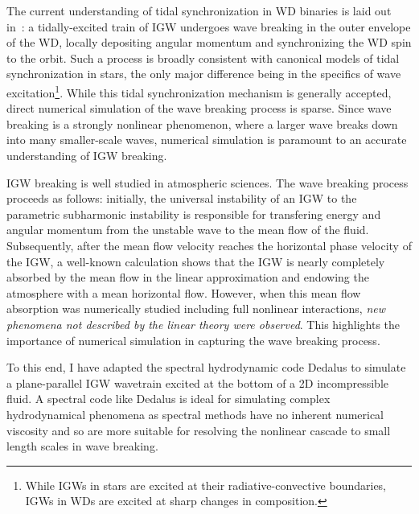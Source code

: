 \documentclass[12pt,
        usenames, %
        dvipsnames %
    ]{article}
\begin{document}
The current understanding of tidal synchronization in WD binaries is laid out
in~\cite{fullerII}: a tidally-excited train of IGW undergoes wave breaking
in the outer envelope of the WD, locally depositing angular momentum and
synchronizing the WD spin to the orbit. Such a process is broadly consistent
with canonical models of tidal synchronization in stars\cite{zahn75,gn89}, the
only major difference being in the specifics of wave excitation\footnote{While
IGWs in stars are excited at their radiative-convective boundaries, IGWs in WDs
are excited at sharp changes in composition.}. While this tidal synchronization
mechanism is generally accepted, direct numerical simulation of the wave
breaking process is sparse. Since wave breaking is a strongly nonlinear
phenomenon, where a larger wave breaks down into many smaller-scale waves,
numerical simulation is paramount to an accurate understanding of IGW breaking.

IGW breaking is well studied in atmospheric sciences. The wave breaking process
proceeds as follows: initially, the universal instability of an IGW to the
parametric subharmonic instability is responsible for transfering energy and
angular momentum from the unstable wave to the mean flow of the
fluid\cite{drazin}. Subsequently, after the mean flow velocity reaches the
horizontal phase velocity of the IGW, a well-known calculation shows that the
IGW is nearly completely absorbed by the mean flow in the linear
approximation and endowing the atmosphere with a mean horizontal
flow\cite{booker_bretherton,hazel}. However, when this mean flow absorption was
numerically studied including full nonlinear interactions, \emph{new phenomena
not described by the linear theory were observed}\cite{jones_num,winters1994}.
This highlights the importance of numerical simulation in capturing the wave
breaking process.

To this end, I have adapted the spectral hydrodynamic code Dedalus\cite{dedalus}
to simulate a plane-parallel IGW wavetrain excited at the bottom of a 2D
incompressible fluid. A spectral code like Dedalus is ideal for simulating
complex hydrodynamical phenomena as spectral methods have no inherent numerical
viscosity and so are more suitable for resolving the nonlinear cascade to small
length scales in wave breaking.
\end{document}
